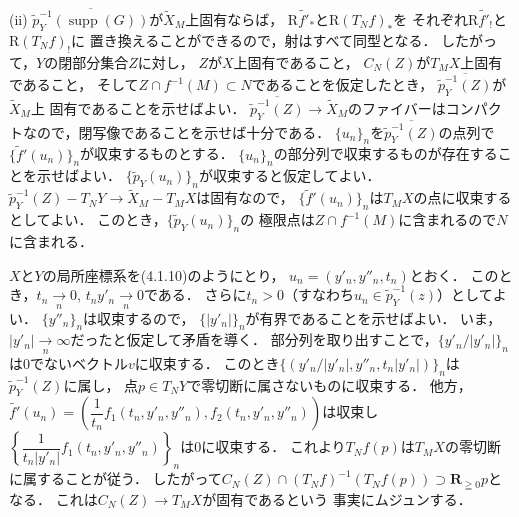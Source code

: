 \documentclass[uplatex,dvipdfmx,a4paper,10pt,draft]{jsarticle}
\makeatletter
\theoremstyle{definition}
\newcommand{\rr}{\mathbf{R}}
\renewenvironment{proof}[1][\proofname]{\par
  \pushQED{\qed}%
  \normalfont \topsep6\p@\@plus6\p@\relax
  \trivlist
  \item[\hskip\labelsep
         \bfseries
    {#1}]\ignorespaces
}{%
  \popQED\endtrivlist\@endpefalse
}
\renewcommand{\proofname}{証明.}
\numberwithin{equation}{section}
\newcommand{\supp}{\mathop{\mathrm{supp}}\nolimits}
\newcommand{\Rder}{\mathrm{R}}
\theoremstyle{mystyle}
\makeatother
\begin{document}
\begin{proof}
    (ii) 
    \(\overline{\tilde{p}_{Y}^{-1}(\supp(G))}\)が\(
        \tilde{X}_M
    \)上固有ならば，
    \(\Rder{\tilde{f'}_{\ast}}\)と\(\Rder(T_{N}f)_{\ast}\)を
    それぞれ\(\Rder{\tilde{f'}_{!}}\)と\(\Rder(T_{N}f)_{!}\)に
    置き換えることができるので，射はすべて同型となる．
    したがって，\(Y\)の閉部分集合\(Z\)に対し，
    \(Z\)が\(X\)上固有であること，
    \(C_{N}(Z)\)が\(T_{M}X\)上固有であること，
    そして\(Z\cap f^{-1}(M)\subset N\)であることを仮定したとき，
    \(\overline{\tilde{p}_{Y}^{-1}(Z)}\)が\(\tilde{X}_{M}\)上
    固有であることを示せばよい．
    \(
        \overline{\tilde{p}_{Y}^{-1}(Z)}\to\tilde{X}_{M}
    \)のファイバーはコンパクトなので，閉写像であることを示せば十分である．
    \(\{u_{n}\}_{n}\)を\(
        \overline{\tilde{p}_{Y}^{-1}(Z)}
    \)の点列で\(\{\tilde{f}'(u_{n})\}_{n}\)が収束するものとする．
    \(\{u_{n}\}_{n}\)の部分列で収束するものが存在することを示せばよい．
    \(\{\tilde{p}_{Y}(u_{n})\}_{n}\)が収束すると仮定してよい．
    \(\tilde{p}^{-1}_{Y}(Z)-T_{N}Y\to \tilde{X}_{M}-T_{M}X\)は固有なので，
    \(\{\tilde{f}'(u_{n})\}_{n}\)は\(T_{M}X\)の点に収束するとしてよい．
    このとき，\(\{\tilde{p}_{Y}(u_{n})\}_{n}\)の
    極限点は\(Z\cap f^{-1}(M)\)に含まれるので\(N\)に含まれる．

    \(X\)と\(Y\)の局所座標系を(4.1.10)のようにとり，
    \(u_{n}=(y'_{n},y''_{n},t_n)\)とおく．
    このとき，\(
        t_{n}\underset{n}{\to}0
    \), \(t_{n}y'_{n}\underset{n}{\to}0\)である．
    さらに\(t_{n}>0\)（すなわち\(
        u_{n}\in\tilde{p}_{Y}^{-1}(z)
    \)）としてよい．
    \(\{y''_{n}\}_{n}\)は収束するので，
    \(\{\lvert{y'_n}\rvert\}_{n}\)が有界であることを示せばよい．
    いま，\(\lvert{y'_{n}}\rvert\underset{n}{\to}\infty\)だったと仮定して矛盾を導く．
    部分列を取り出すことで，\(
        \{y'_{n}/\lvert{y'_{n}}\rvert\}_{n}
    \)は\(0\)でないベクトル\(v\)に収束する．
    このとき\(
        \{(y'_{n}/\lvert{y'_{n}}\rvert,
        y''_{n},
        t_{n}\lvert{y'_{n}}\rvert)\}_{n}
    \)は\(\tilde{p}^{-1}_{Y}(Z)\)に属し，
    点\(p\in T_{N}Y\)で零切断に属さないものに収束する．
    他方，\(
        \tilde{f'}(u_{n})
        =\left(
            \dfrac{1}{t_{n}}f_1(t_n,y'_n,y''_n),
            f_2(t_n,y'_n,y''_n)
        \right)
    \)は収束し\(
        \left\{
            \dfrac{1}{t_{n}\lvert{y'_{n}}\rvert}
            f_{1}(t_{n},y'_n,y''_n)
        \right\}_{n}
    \)は\(0\)に収束する．
    これより\(T_{N}f(p)\)は\(T_{M}X\)の零切断に属することが従う．
    したがって\(
        C_{N}(Z)\cap (T_{N}f)^{-1}(T_{N}f(p))
        \supset\rr_{\geqq0}p
    \)となる．
    これは\(C_{N}(Z)\to T_{M}X\)が固有であるという
    事実にムジュンする．
\end{proof}
\end{document}
